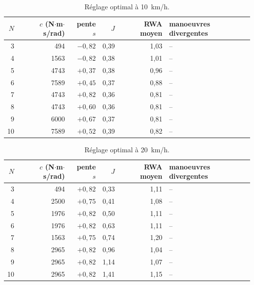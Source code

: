 \begin{table}[ht]\centering\small
\begin{tabular}{@{}r r r r r l@{}}\toprule
$N$ & $c$ (N$\cdot$m$\cdot$s/rad) & pente $s$ & $J$ & RWA moyen & manoeuvres divergentes\\\midrule
3 & 494 & $-0{,}82$ & 0{,}39 & 1{,}03 & --\\
4 & 1563 & $-0{,}82$ & 0{,}38 & 1{,}01 & --\\
5 & 4743 & $+0{,}37$ & 0{,}38 & 0{,}96 & --\\
6 & 7589 & $+0{,}45$ & 0{,}37 & 0{,}88 & --\\
7 & 4743 & $+0{,}82$ & 0{,}36 & 0{,}81 & --\\
8 & 4743 & $+0{,}60$ & 0{,}36 & 0{,}81 & --\\
9 & 6000 & $+0{,}67$ & 0{,}37 & 0{,}81 & --\\
10 & 7589 & $+0{,}52$ & 0{,}39 & 0{,}82 & --\\
\bottomrule\end{tabular}
\caption{Réglage optimal à \SI{10}{km/h}.}\label{tab:opt10}\end{table}

\begin{table}[ht]\centering\small
\begin{tabular}{@{}r r r r r l@{}}\toprule
$N$ & $c$ (N$\cdot$m$\cdot$s/rad) & pente $s$ & $J$ & RWA moyen & manoeuvres divergentes\\\midrule
3 & 494 & $+0{,}82$ & 0{,}33 & 1{,}11 & --\\
4 & 2500 & $+0{,}75$ & 0{,}41 & 1{,}08 & --\\
5 & 1976 & $+0{,}82$ & 0{,}50 & 1{,}11 & --\\
6 & 1976 & $+0{,}82$ & 0{,}63 & 1{,}11 & --\\
7 & 1563 & $+0{,}75$ & 0{,}74 & 1{,}20 & --\\
8 & 2965 & $+0{,}82$ & 0{,}96 & 1{,}04 & --\\
9 & 2965 & $+0{,}82$ & 1{,}14 & 1{,}07 & --\\
10 & 2965 & $+0{,}82$ & 1{,}41 & 1{,}15 & --\\
\bottomrule\end{tabular}
\caption{Réglage optimal à \SI{20}{km/h}.}\label{tab:opt20}\end{table}


